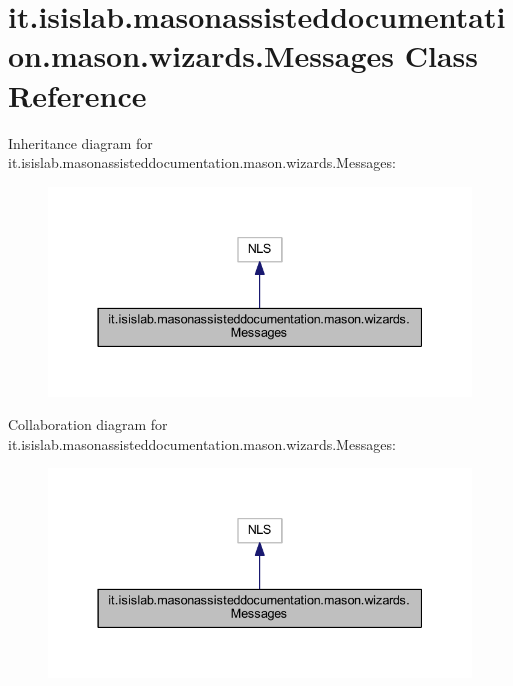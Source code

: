 \hypertarget{classit_1_1isislab_1_1masonassisteddocumentation_1_1mason_1_1wizards_1_1_messages}{\section{it.\-isislab.\-masonassisteddocumentation.\-mason.\-wizards.\-Messages Class Reference}
\label{classit_1_1isislab_1_1masonassisteddocumentation_1_1mason_1_1wizards_1_1_messages}
}


Inheritance diagram for it.\-isislab.\-masonassisteddocumentation.\-mason.\-wizards.\-Messages\-:
\nopagebreak
\begin{figure}[H]
\begin{center}
\leavevmode
\includegraphics[width=337pt]{classit_1_1isislab_1_1masonassisteddocumentation_1_1mason_1_1wizards_1_1_messages__inherit__graph}
\end{center}
\end{figure}


Collaboration diagram for it.\-isislab.\-masonassisteddocumentation.\-mason.\-wizards.\-Messages\-:
\nopagebreak
\begin{figure}[H]
\begin{center}
\leavevmode
\includegraphics[width=337pt]{classit_1_1isislab_1_1masonassisteddocumentation_1_1mason_1_1wizards_1_1_messages__coll__graph}
\end{center}
\end{figure}
